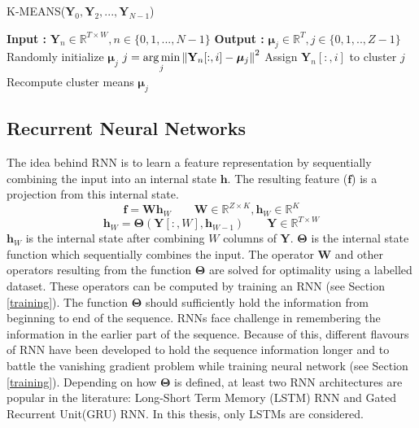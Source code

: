 \begin{algorithm}
  \caption{K-MEANS($\textbf{Y}_{0}, \textbf{Y}_{2},..., \textbf{Y}_{N-1}$) }\label{alg:kmeans}
  \begin{algorithmic}[1]
    \Statex \textbf{Input :} $\textbf{Y}_{n} \in \mathbb{R}^{T \times W}, n \in \{0,1,...,N-1\}$
    \Statex \textbf{Output :} $\bm{\mu}_{j} \in \mathbb{R}^{T}, j \in \{0,1,..,Z-1\}$
    \State Randomly initialize $\bm{\mu}_{j}$
         \State $j = \operatorname*{arg\,min}\limits_{j} \left\lVert\textbf{Y}_{n}[:,i] - \bm{\mu}_{j}\right\rVert^{2}$
          \State Assign $\textbf{Y}_{n}[:,i]$ to cluster $j$
      \EndFor
    \EndFor
   \State Recompute cluster means $\bm{\mu}_{j}$
   \EndWhile
  \end{algorithmic}
\end{algorithm}
\FloatBarrier

\subsection{Recurrent Neural Networks}
\label{rnn}
The idea behind RNN is to learn a feature representation by sequentially combining the input into an internal state $\textbf{h}$. The resulting feature ($\textbf{f}$) is a projection from this internal state.
\[ 
\textbf{f} = \textbf{W}\textbf{h}_{W} \qquad \textbf{W} \in \mathbb{R}^{Z \times K}, \textbf{h}_{W} \in \mathbb{R}^{K}
\]
\[
\textbf{h}_{W} = \bm{\Theta}(\textbf{Y}[:,W], \textbf{h}_{W-1}) \qquad \textbf{Y} \in \mathbb{R}^{T \times W}
\]
$\textbf{h}_{W}$ is the internal state after combining $W$ columns of $\textbf{Y}$. $\bm{\Theta}$ is the internal state function which sequentially combines the input. The operator $\textbf{W}$ and other operators resulting from the function $\bm{\Theta}$ are solved for optimality using a labelled dataset. These operators can be computed by training an RNN (see Section \ref{training}). The function $\bm{\Theta}$ should sufficiently hold the information from beginning to end of the sequence. RNNs face challenge in remembering the information in the earlier part of the sequence. Because of this, different flavours of RNN have been developed to hold the sequence information longer and to battle the vanishing gradient problem while training neural network (see Section \ref{training}). Depending on how $\bm{\Theta}$ is defined, at least two RNN architectures are popular in the literature: Long-Short Term Memory (LSTM) RNN and Gated Recurrent Unit(GRU) RNN. In this thesis, only LSTMs\cite{LSTM} are considered.   

